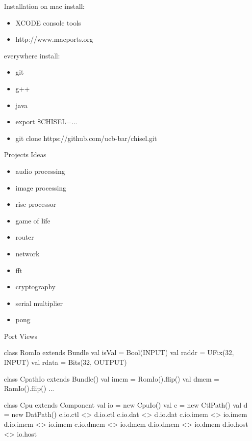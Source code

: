 \documentclass[xcolor=pdflatex,dvipsnames,table]{beamer}
\begin{document}
\begin{frame}[fragile]{Installation}
on mac install:
\begin{itemize}
\item XCODE console tools
\item http://www.macports.org
\end{itemize}

everywhere install:
\begin{itemize}
\item git
\item g++
\item java
\item export \$CHISEL=...
\item git clone https://github.com/ucb-bar/chisel.git
\end{itemize}

\end{frame}

\begin{frame}[fragile]{Projects Ideas}

\begin{itemize}
\item audio processing
\item image processing
\item risc processor
\item game of life
\item router
\item network
\item fft
\item cryptography
\item serial multiplier
\item pong
\end{itemize}

\end{frame}

\begin{frame}[fragile]{Port Views}

{
\begin{scala}
class RomIo extends Bundle {
  val isVal = Bool(INPUT)
  val raddr = UFix(32, INPUT)
  val rdata = Bits(32, OUTPUT)
}

class CpathIo extends Bundle() {
  val imem = RomIo().flip()
  val dmem = RamIo().flip()
  ...
}

class Cpu extends Component {
  val io = new CpuIo()
  val c  = new CtlPath()
  val d  = new DatPath()
  c.io.ctl  <> d.io.ctl
  c.io.dat  <> d.io.dat
  c.io.imem <> io.imem
  d.io.imem <> io.imem
  c.io.dmem <> io.dmem
  d.io.dmem <> io.dmem
  d.io.host <> io.host
}
\end{scala}
}

\end{frame}
\end{document}
